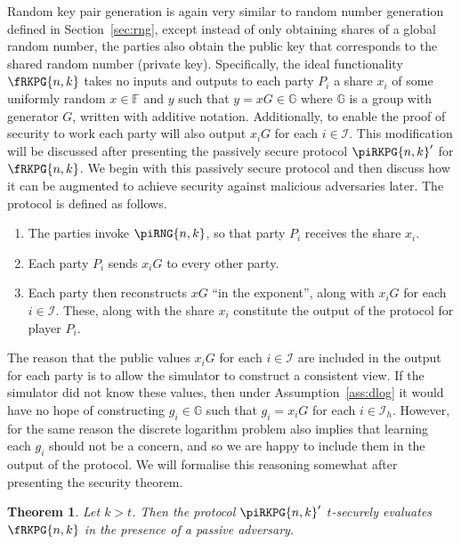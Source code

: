 \documentclass{article}
\newtheorem{theorem}{Theorem}
\theoremstyle{remark}
\newcommand{\F}{\mathbb{F}}
\newcommand{\G}{\mathbb{G}}
\begin{document}
Random key pair generation is again very similar to random number generation
defined in Section~\ref{sec:rng}, except instead of only obtaining shares of a
global random number, the parties also obtain the public key that corresponds
to the shared random number (private key). Specifically, the ideal
functionality $\fRKPG{n,k}$ takes no inputs and outputs to each party $P_i$ a
share $x_i$ of some uniformly random $x \in \F$ and $y$ such that $y = xG \in
\G$ where $\G$ is a group with generator $G$, written with additive notation.
Additionally, to enable the proof of security to work each party will also
output $x_i G$ for each $i \in \mathcal{I}$. This modification will be
discussed after presenting the passively secure protocol ${\piRKPG{n,k}}'$ for
$\fRKPG{n,k}$. We begin with this passively secure protocol and then discuss
how it can be augmented to achieve security against malicious adversaries
later. The protocol is defined as follows.

\begin{enumerate}
	\item The parties invoke $\piRNG{n,k}$, so that party $P_i$ receives the
		share $x_i$.

	\item\label{enum:rkpgPassBC} Each party $P_i$ sends $x_i G$ to every other
		party.

	\item Each party then reconstructs $xG$ ``in the exponent'', along with
		$x_i G$ for each $i \in \mathcal{I}$. These, along with the share $x_i$
		constitute the output of the protocol for player $P_i$.
\end{enumerate}

The reason that the public values $x_i G$ for each $i \in \mathcal{I}$ are
included in the output for each party is to allow the simulator to construct a
consistent view. If the simulator did not know these values, then under
Assumption~\ref{ass:dlog} it would have no hope of constructing $g_i \in \G$
such that $g_i = x_i G$ for each $i \in \mathcal{I}_h$. However, for the same
reason the discrete logarithm problem also implies that learning each $g_i$
should not be a concern, and so we are happy to include them in the output of
the protocol. We will formalise this reasoning somewhat after presenting the
security theorem.

\begin{theorem}\label{thm:rkpg}
	Let $k > t$. Then the protocol ${\piRKPG{n,k}}'$ $t$-securely evaluates
	$\fRKPG{n,k}$ in the presence of a passive adversary.
\end{theorem}
\end{document}
